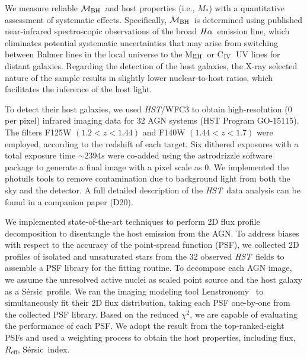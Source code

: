 \documentclass[twocolumn,trackchanges]{aastex63}
\newcommand{\hst}{{\it HST}}
\newcommand{\mbh}{$\mathcal M_{\rm BH}$}
\newcommand{\mr}{$Mag_{\rm ~R}$}
\newcommand{\halpha}{${\it H}\alpha$}
\newcommand{\sersic}{S\'ersic}
\newcommand{\lenstronomy}{{\sc Lenstronomy}}
\newcommand{\reff}{{$R_{\mathrm{eff}}$}}
\newcommand{\mstar}{{$M_*$}}
\newcommand{\Mgii}{Mg$_{\rm II}$}
\newcommand{\Civ}{C$_{\rm IV}$}
\begin{document}
We measure reliable \mbh\ and host properties (i.e., \mstar) with a quantitative assessment of systematic effects. Specifically, \mbh\ is determined using published near-infrared spectroscopic observations of the broad \halpha\ emission line, which eliminates potential systematic uncertainties that may arise from switching between Balmer lines in the local universe to the \Mgii\ or \Civ\ UV lines for distant galaxies. Regarding the detection of the host galaxies, the X-ray selected nature of the sample results in slightly lower nuclear-to-host ratios, which facilitates the inference of the host light. 

To detect their host galaxies, we used \hst/WFC3 to obtain high-resolution (0 per pixel) infrared imaging data for 32 AGN systems (HST Program GO-15115). The filters F125W $(1.2<z<1.44)$ and F140W $(1.44<z<1.7)$ were employed, according to the redshift of each target. Six dithered exposures with a total exposure time $\sim2394s$ were co-added using the {\sc astrodrizzle} software package to generate a final image with a pixel scale as 0. We implemented the {\sc photuils} tools to remove contamination due to background light from both the sky and the detector. A full detailed description of the \hst\ data analysis can be found in a companion paper (D20).

We implemented state-of-the-art techniques to perform 2D flux profile decomposition to disentangle the host emission from the AGN. To address biases with respect to the accuracy of the point-spread function (PSF), we collected 2D profiles of isolated and unsaturated stars from the 32 observed \hst\ fields to assemble a PSF library for the fitting routine. To decompose each AGN image, we assume the unresolved active nuclei as scaled point source and the host galaxy as a \sersic\ profile. We ran the imaging modeling tool \lenstronomy~\citep{lenstronomy} to simultaneously fit their 2D flux distribution, taking each PSF one-by-one from the collected PSF library. Based on the reduced $\chi^2$, we are capable of evaluating the performance of each PSF. We adopt the result from the top-ranked-eight PSFs and used a weighting process to obtain the host properties, including flux, \reff, \sersic\ index.
\end{document}
